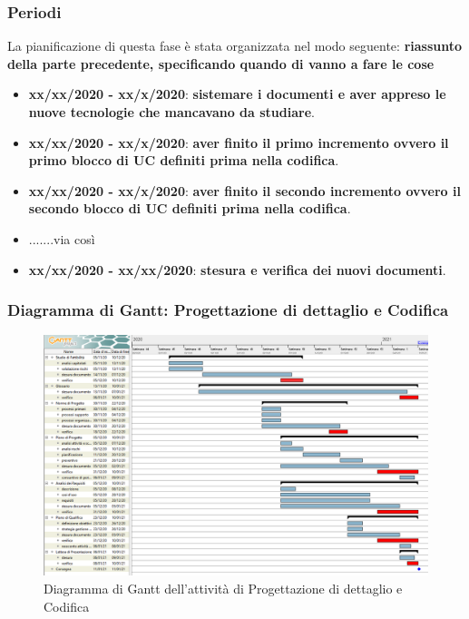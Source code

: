 \subsubsection{Periodi}
La pianificazione di questa fase è stata organizzata nel modo seguente:
\textbf{riassunto della parte precedente, specificando quando di vanno a fare le cose}
\begin{itemize}
\item \textbf{xx/xx/2020 - xx/x/2020}: \textbf{sistemare i documenti e aver appreso le nuove tecnologie che mancavano da studiare}.

\item \textbf{xx/xx/2020 - xx/x/2020}: \textbf{aver finito il primo incremento ovvero il primo blocco di UC definiti prima nella codifica}.

\item \textbf{xx/xx/2020 - xx/x/2020}: \textbf{aver finito il secondo incremento ovvero il secondo blocco di UC definiti prima nella codifica}.

\item .......via così

\item \textbf{xx/xx/2020 - xx/xx/2020}: \textbf{stesura e verifica dei nuovi documenti}.
\end{itemize}

\subsubsection{Diagramma di Gantt: Progettazione di dettaglio e Codifica}
\begin{figure}[h]
	\includegraphics[scale=0.45]{img/gant-analisi.PNG}
	\caption{Diagramma di Gantt dell'attività di Progettazione di dettaglio e Codifica}
\end{figure}